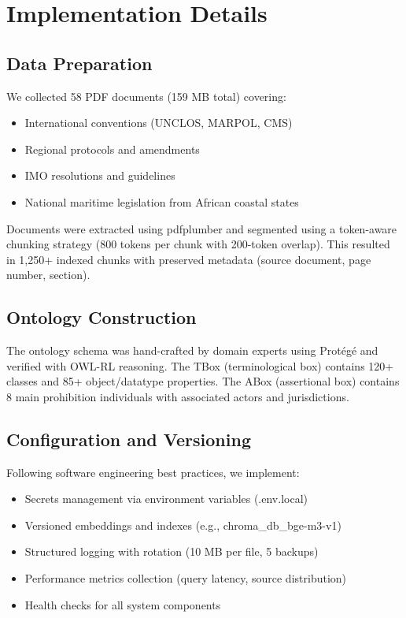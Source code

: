 \documentclass[11pt,a4paper]{article}
\begin{document}
\section{Implementation Details}

\subsection{Data Preparation}

We collected 58 PDF documents (159 MB total) covering:
\begin{itemize}
\item International conventions (UNCLOS, MARPOL, CMS)
\item Regional protocols and amendments
\item IMO resolutions and guidelines
\item National maritime legislation from African coastal states
\end{itemize}

Documents were extracted using pdfplumber and segmented using a token-aware chunking strategy (800 tokens per chunk with 200-token overlap). This resulted in 1,250+ indexed chunks with preserved metadata (source document, page number, section).

\subsection{Ontology Construction}

The ontology schema was hand-crafted by domain experts using Protégé and verified with OWL-RL reasoning. The TBox (terminological box) contains 120+ classes and 85+ object/datatype properties. The ABox (assertional box) contains 8 main prohibition individuals with associated actors and jurisdictions.

\subsection{Configuration and Versioning}

Following software engineering best practices, we implement:
\begin{itemize}
\item Secrets management via environment variables (.env.local)
\item Versioned embeddings and indexes (e.g., chroma\_db\_bge-m3-v1)
\item Structured logging with rotation (10 MB per file, 5 backups)
\item Performance metrics collection (query latency, source distribution)
\item Health checks for all system components
\end{itemize}
\end{document}
